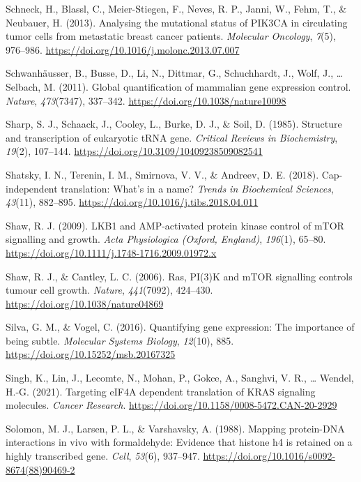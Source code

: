 \documentclass[12pt,openany]{book}
\begin{document}
\hypertarget{ref-Schneck2013}{}
Schneck, H., Blassl, C., Meier-Stiegen, F., Neves, R. P., Janni, W.,
Fehm, T., \& Neubauer, H. (2013). Analysing the mutational status of
PIK3CA in circulating tumor cells from metastatic breast cancer
patients. \emph{Molecular Oncology}, \emph{7}(5), 976--986.
\url{https://doi.org/10.1016/j.molonc.2013.07.007}

\hypertarget{ref-Schwanhausser2011}{}
Schwanhäusser, B., Busse, D., Li, N., Dittmar, G., Schuchhardt, J.,
Wolf, J., \ldots{} Selbach, M. (2011). Global quantification of
mammalian gene expression control. \emph{Nature}, \emph{473}(7347),
337--342. \url{https://doi.org/10.1038/nature10098}

\hypertarget{ref-Sharp1985}{}
Sharp, S. J., Schaack, J., Cooley, L., Burke, D. J., \& Soil, D. (1985).
Structure and transcription of eukaryotic tRNA gene. \emph{Critical
Reviews in Biochemistry}, \emph{19}(2), 107--144.
\url{https://doi.org/10.3109/10409238509082541}

\hypertarget{ref-Shatsky2018}{}
Shatsky, I. N., Terenin, I. M., Smirnova, V. V., \& Andreev, D. E.
(2018). Cap-independent translation: What's in a name? \emph{Trends in
Biochemical Sciences}, \emph{43}(11), 882--895.
\url{https://doi.org/10.1016/j.tibs.2018.04.011}

\hypertarget{ref-Shaw2009}{}
Shaw, R. J. (2009). LKB1 and AMP-activated protein kinase control of
mTOR signalling and growth. \emph{Acta Physiologica (Oxford, England)},
\emph{196}(1), 65--80.
\url{https://doi.org/10.1111/j.1748-1716.2009.01972.x}

\hypertarget{ref-Shaw2006}{}
Shaw, R. J., \& Cantley, L. C. (2006). Ras, PI(3)K and mTOR signalling
controls tumour cell growth. \emph{Nature}, \emph{441}(7092), 424--430.
\url{https://doi.org/10.1038/nature04869}

\hypertarget{ref-Silva2016}{}
Silva, G. M., \& Vogel, C. (2016). Quantifying gene expression: The
importance of being subtle. \emph{Molecular Systems Biology},
\emph{12}(10), 885. \url{https://doi.org/10.15252/msb.20167325}

\hypertarget{ref-Singh2021}{}
Singh, K., Lin, J., Lecomte, N., Mohan, P., Gokce, A., Sanghvi, V. R.,
\ldots{} Wendel, H.-G. (2021). Targeting eIF4A dependent translation of
KRAS signaling molecules. \emph{Cancer Research}.
\url{https://doi.org/10.1158/0008-5472.CAN-20-2929}

\hypertarget{ref-Solomon1988}{}
Solomon, M. J., Larsen, P. L., \& Varshavsky, A. (1988). Mapping
protein-DNA interactions in vivo with formaldehyde: Evidence that
histone h4 is retained on a highly transcribed gene. \emph{Cell},
\emph{53}(6), 937--947.
\url{https://doi.org/10.1016/s0092-8674(88)90469-2}
\end{document}
